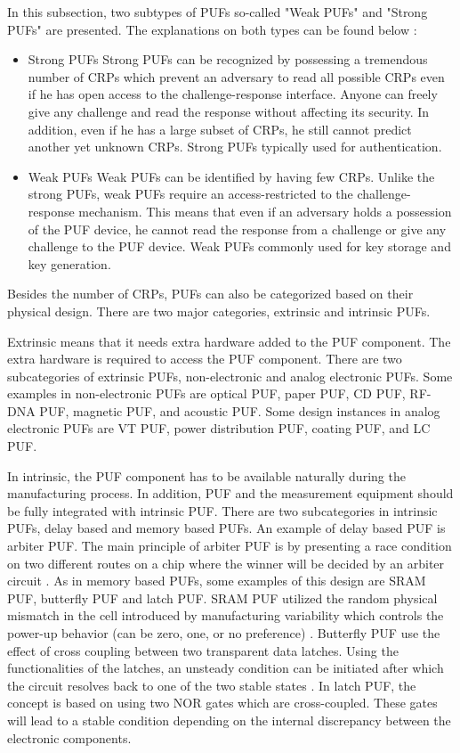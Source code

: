 In this subsection, two subtypes of PUFs so-called "Weak PUFs" and "Strong PUFs" are presented.  The explanations on both types can be found below \cite{6800561}:
\begin{itemize}
\item Strong PUFs\newline
Strong PUFs can be recognized by possessing a tremendous number of CRPs which prevent an adversary to read all possible CRPs even if he has open access to the challenge-response interface. Anyone can freely give any challenge and read the response without affecting its security. In addition, even if he has a large subset of CRPs, he still cannot predict another yet unknown CRPs. Strong PUFs typically used for authentication.
\item Weak PUFs\newline
Weak PUFs can be identified by having few CRPs. Unlike the strong PUFs, weak PUFs require an access-restricted to the challenge-response mechanism. This means that even if an adversary holds a possession of the PUF device, he cannot read the response from a challenge or give any challenge to the PUF device. Weak PUFs commonly used for key storage and key generation.
\end{itemize}

Besides the number of CRPs, PUFs can also be categorized based on their physical design. There are two major categories, extrinsic and intrinsic PUFs.

Extrinsic means that it needs extra hardware added to the PUF component. The extra hardware is required to access the PUF component. There are two subcategories of extrinsic PUFs, non-electronic and analog electronic PUFs. Some examples in non-electronic PUFs are optical PUF, paper PUF, CD PUF, RF-DNA PUF, magnetic PUF, and acoustic PUF. Some design instances in analog electronic PUFs are VT PUF, power distribution PUF, coating PUF, and LC PUF.

In intrinsic, the PUF component has to be available naturally during the manufacturing process. In addition, PUF and the measurement equipment should be fully integrated with intrinsic PUF. There are two subcategories in intrinsic PUFs, delay based and memory based PUFs. An example of delay based PUF is arbiter PUF. The main principle of arbiter PUF is by presenting a race condition on two different routes on a chip where the winner will be decided by an arbiter circuit \cite{study_of_the_art_puf}. As in memory based PUFs, some examples of this design are SRAM PUF, butterfly PUF and latch PUF. SRAM PUF utilized the random physical mismatch in the cell introduced by manufacturing variability which controls the power-up behavior (can be zero, one, or no preference) \cite{study_of_the_art_puf}. Butterfly PUF use the effect of cross coupling between two transparent data latches. Using the functionalities of the latches, an unsteady condition can be initiated after which the circuit resolves back to one of the two stable states \cite{study_of_the_art_puf}. In latch PUF, the concept is based on using two NOR gates which are cross-coupled. These gates will lead to a stable condition depending on the internal discrepancy between the electronic components.

